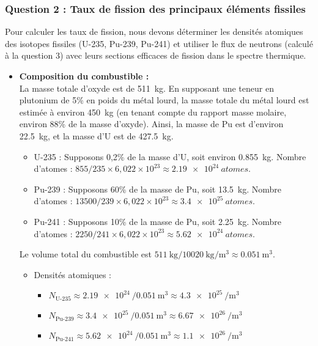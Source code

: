 \documentclass[12pt,a4paper]{article}
\begin{document}
\subsubsection*{Question 2 : Taux de fission des principaux éléments fissiles}
Pour calculer les taux de fission, nous devons déterminer les densités atomiques des isotopes fissiles (U-235, Pu-239, Pu-241) et utiliser le flux de neutrons (calculé à la question 3) avec leurs sections efficaces de fission dans le spectre thermique.
\begin{itemize}
  \item \textbf{Composition du combustible :}\\
    La masse totale d'oxyde est de \SI{511}{\kilogram}. En supposant une teneur en plutonium de 5\% en poids du métal lourd, la masse totale du métal lourd est estimée à environ \SI{450}{\kilogram} (en tenant compte du rapport masse molaire, environ 88\% de la masse d'oxyde). Ainsi, la masse de Pu est d'environ \SI{22,5}{\kilogram}, et la masse d'U est de \SI{427,5}{\kilogram}.
    \begin{itemize}
      \item U-235 : Supposons 0,2\% de la masse d'U, soit environ \SI{0,855}{\kilogram}. Nombre d'atomes : $855 / 235 \times 6,022 \times 10^{23} \approx \SI{2,19e24}{atomes}$.
      \item Pu-239 : Supposons 60\% de la masse de Pu, soit \SI{13,5}{\kilogram}. Nombre d'atomes : $13500 / 239 \times 6,022 \times 10^{23} \approx \SI{3,4e25}{atomes}$.
      \item Pu-241 : Supposons 10\% de la masse de Pu, soit \SI{2,25}{\kilogram}. Nombre d'atomes : $2250 / 241 \times 6,022 \times 10^{23} \approx \SI{5,62e24}{atomes}$.
    \end{itemize}
    Le volume total du combustible est $\SI{511}{\kilogram} / \SI{10020}{\kilogram\per\cubic\meter} \approx \SI{0,051}{\cubic\meter}$.
    \begin{itemize}
      \item Densités atomiques :
        \begin{itemize}
          \item $N_{\text{U-235}} \approx \SI{2,19e24}{} / \SI{0,051}{\cubic\meter} \approx \SI{4,3e25}{\per\cubic\meter}$
          \item $N_{\text{Pu-239}} \approx \SI{3,4e25}{} / \SI{0,051}{\cubic\meter} \approx \SI{6,67e26}{\per\cubic\meter}$
          \item $N_{\text{Pu-241}} \approx \SI{5,62e24}{} / \SI{0,051}{\cubic\meter} \approx \SI{1,1e26}{\per\cubic\meter}$

\end{itemize}
\end{itemize}
\end{itemize}
\end{document}
